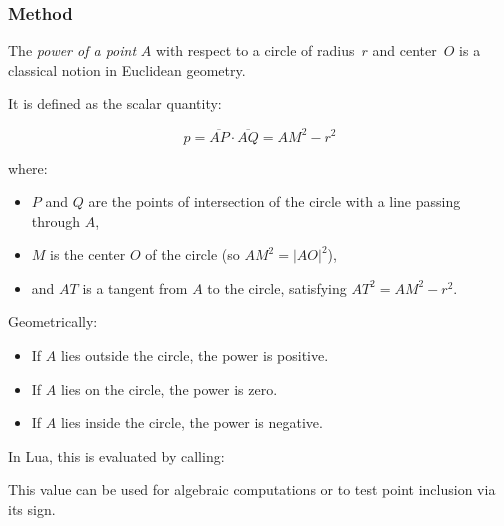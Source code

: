 \subsubsection{Method }
\label{ssub:method_circle_power_pt}

The \emph{power of a point} $A$ with respect to a circle of radius~$r$ and center~$O$ is a classical notion in Euclidean geometry.

\medskip
\noindent
It is defined as the scalar quantity:

\[
p = \overline{AP} \cdot \overline{AQ} = AM^2 - r^2
\]

where:
\begin{itemize}
  \item $P$ and $Q$ are the points of intersection of the circle with a line passing through $A$,
  \item $M$ is the center $O$ of the circle (so $AM^2 = |AO|^2$),
  \item and $AT$ is a tangent from $A$ to the circle, satisfying $AT^2 = AM^2 - r^2$.
\end{itemize}

\noindent
Geometrically:
\begin{itemize}
  \item If $A$ lies outside the circle, the power is positive.
  \item If $A$ lies on the circle, the power is zero.
  \item If $A$ lies inside the circle, the power is negative.
\end{itemize}

\medskip
\noindent
In Lua, this is evaluated by calling:

\begin{center}
\end{center}

\noindent
This value can be used for algebraic computations or to test point inclusion via its sign.

\vspace{1em}

